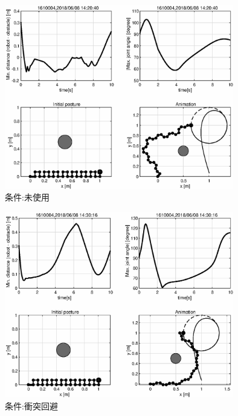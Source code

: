 \documentclass[a4paper,11pt,titlepage]{jsarticle}
\begin{document}
{\begin{figure}[H]
  \begin{center}
    \includegraphics[width = 10cm]{画像/eps_冗長_未使用_結果}
    \caption{条件:未使用}
    \label{未使用}
  \end{center}
\end{figure}

\begin{figure}[H]
  \begin{center}
    \includegraphics[width = 10cm]{画像/eps_冗長_衝突回避_結果}
    \caption{条件:衝突回避}
    \label{衝突回避}
  \end{center}
\end{figure}


}
\end{document}
